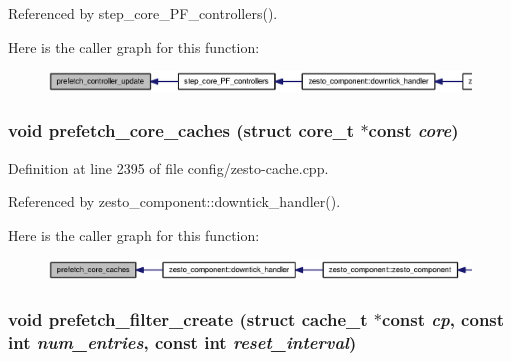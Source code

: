 Referenced by step\_\-core\_\-PF\_\-controllers().

Here is the caller graph for this function:\nopagebreak
\begin{figure}[H]
\begin{center}
\leavevmode
\includegraphics[width=419pt]{config_2zesto-cache_8cpp_563b4fe087e7d8225f1e3aea2f1e8235_icgraph}
\end{center}
\end{figure}
\subsubsection[{prefetch\_\-core\_\-caches}]{\setlength{\rightskip}{0pt plus 5cm}void prefetch\_\-core\_\-caches (struct {\bf core\_\-t} $\ast$const  {\em core})}\label{config_2zesto-cache_8cpp_3f3ef48df254425f422f6cf5de128ade}




Definition at line 2395 of file config/zesto-cache.cpp.

Referenced by zesto\_\-component::downtick\_\-handler().

Here is the caller graph for this function:\nopagebreak
\begin{figure}[H]
\begin{center}
\leavevmode
\includegraphics[width=327pt]{config_2zesto-cache_8cpp_3f3ef48df254425f422f6cf5de128ade_icgraph}
\end{center}
\end{figure}
\subsubsection[{prefetch\_\-filter\_\-create}]{\setlength{\rightskip}{0pt plus 5cm}void prefetch\_\-filter\_\-create (struct {\bf cache\_\-t} $\ast$const  {\em cp}, \/  const int {\em num\_\-entries}, \/  const int {\em reset\_\-interval})}\label{config_2zesto-cache_8cpp_81be4d7fbc22a3d9f3fcaa52715c22e9}




